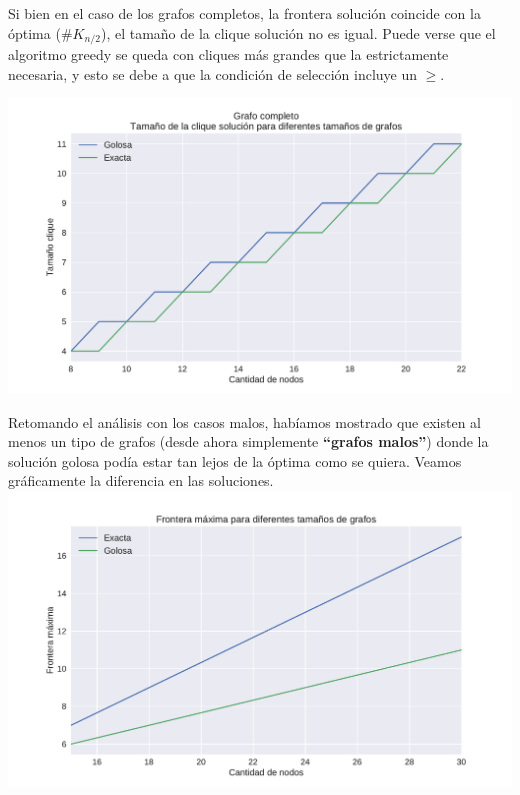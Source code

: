 Si bien en el caso de los grafos completos, la frontera solución coincide con la óptima ($\#K_{n/2}$), el tamaño de la clique solución no es igual. Puede verse que el algoritmo greedy se queda con cliques más grandes que la estrictamente necesaria, y esto se debe a que la condición de selección incluye un $\geq$.

{\centering
    \includegraphics[width=1\textwidth]{informe/imgs/exp_completo_clique_greedy_exacta.pdf} \\
}

Retomando el análisis con los casos malos, habíamos mostrado que existen al menos un tipo de grafos (desde ahora simplemente \textbf{``grafos malos''}) donde la solución golosa podía estar tan lejos de la óptima como se quiera. Veamos gráficamente la diferencia en las soluciones. \\

{\centering
    \includegraphics[width=1\textwidth]{informe/imgs/exp_malo_frontera_greedy_exacta.pdf} \\
}
$ $\newline

